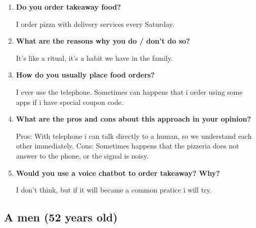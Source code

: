 \begin{enumerate}

\item \textbf{Do you order takeaway food?}

I order pizza with delivery services every Saturday.

\item \textbf{What are the reasons why you do / don't do so?}

It's like a ritual, it's a habit we have in the family.

\item \textbf{How do you usually place food orders?}

I ever use the telephone. Sometimes can happens that i order using some apps if i have special coupon code.

\item \textbf{What are the pros and cons about this approach in your opinion?}

Pros: With telephone i can talk directly to a human, so we understand each other immediately.
Cons: Sometimes happens that the pizzeria does not answer to the phone, or the signal is noisy.

\item \textbf{Would you use a voice chatbot to order takeaway? Why?}

I don't think, but if it will became a common pratice i will try.

\end{enumerate}


\subsection*{A men (52 years old)}

